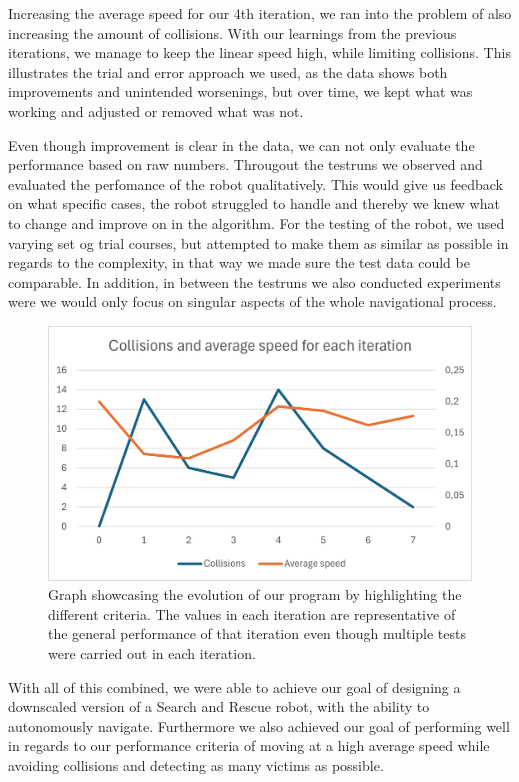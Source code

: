 \documentclass[conference]{IEEEtran}
\begin{document}
Increasing the average speed for our 4th iteration, we ran into the problem of also increasing the amount of collisions.
With our learnings from the previous iterations, we manage to keep the linear speed high, while limiting collisions.
This illustrates the trial and error approach we used, as the data shows both improvements and unintended worsenings, but over time, we kept what was working and adjusted or removed what was not. 

Even though improvement is clear in the data, we can not only evaluate the performance based on raw numbers. 
Througout the testruns we observed and evaluated the perfomance of the robot qualitatively.
This would give us feedback on what specific cases, the robot struggled to handle and thereby we knew what to change and improve on in the algorithm.
For the testing of the robot, we used varying set og trial courses, but attempted to make them as similar as possible in regards to the complexity, in that way we made sure the test data could be comparable.
In addition, in between the testruns we also conducted experiments were we would only focus on singular aspects of the whole navigational process.
\begin{figure}[htbp]
    \centerline{\includegraphics[width=1.0\columnwidth]{Pictures/Graph.png}}
    \caption{Graph showcasing the evolution of our program by highlighting the different criteria. The values in each iteration are representative of the general performance of that iteration even though multiple tests were carried out in each iteration.}
    \label{sec:graph}
    \end{figure}

With all of this combined, we were able to achieve our goal of designing a downscaled version of a Search and Rescue robot, with the ability to autonomously navigate.
Furthermore we also achieved our goal of performing well in regards to our performance criteria of moving at a high average speed while avoiding collisions and detecting as many victims as possible.
\end{document}
